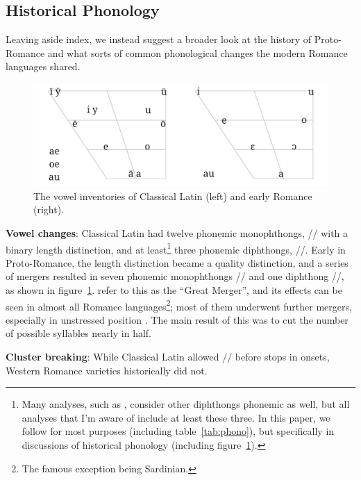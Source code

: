 \documentclass[12pt,twoside]{article}
\newcommand{\ipa}[1]{/\textipa{#1}/}
\begin{document}
\subsection{Historical Phonology}

Leaving aside  index, we instead suggest a broader look at the history of Proto-Romance and what sorts of common phonological changes the modern Romance languages shared.

\begin{figure}[h]
\centering
\noindent\includegraphics[width=\linewidth]{vowelchange}
\caption{The vowel inventories of Classical Latin (left) and early Romance (right).}
\label{fig:vowels}
\end{figure}

\textbf{Vowel changes}: Classical Latin had twelve phonemic monophthongs, \ipa{i e a o u} with a binary length distinction, and at least\footnote{Many analyses, such as \citet{allen}, consider other diphthongs phonemic as well, but all analyses that I'm aware of include at least these three. In this paper, we follow \citeauthor{allen} for most purposes (including table~\ref{tab:phono}), but \citet{alkire} specifically in discussions of historical phonology (including figure~\ref{fig:vowels}).} three phonemic diphthongs, \ipa{a\textsubarch{e} o\textsubarch{e} a\textsubarch{u}}. Early in Proto-Romance, the length distinction became a quality distinction, and a series of mergers resulted in seven phonemic monophthongs \ipa{i e E a O o u} and one diphthong \ipa{a\textsubarch{u}}, as shown in figure~\ref{fig:vowels}. \citet{alkire} refer to this as the ``Great Merger'', and its effects can be seen in almost all Romance languages\footnote{The famous exception being Sardinian.}; most of them underwent further mergers, especially in unstressed position \citep{alkire}. The main result of this was to cut the number of possible syllables nearly in half.

\textbf{Cluster breaking}: While Classical Latin allowed \ipa{s} before stops in onsets, Western Romance varieties historically did not.
\end{document}
